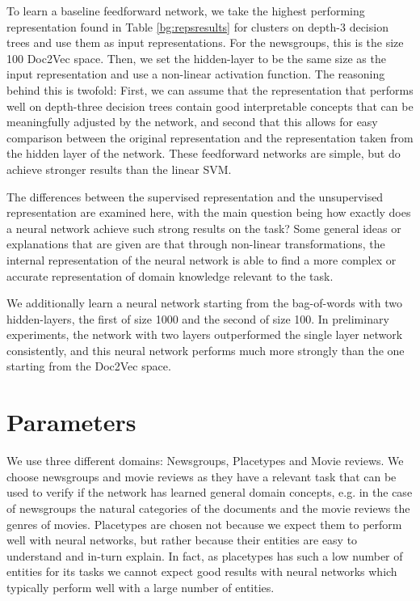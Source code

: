 To learn a baseline feedforward network, we take the highest performing representation found in Table \ref{bg:repsresults} for clusters on depth-3 decision trees and use them as input representations.   For the newsgroups, this is the size 100 Doc2Vec space. Then, we set the hidden-layer to be the same size as the input representation and use a non-linear activation function.  The reasoning behind this is twofold: First, we can assume that the representation that performs well on depth-three decision trees contain good interpretable concepts that can be meaningfully adjusted by the network, and second that this allows for easy comparison between the original representation and the representation taken from the hidden layer of the network. These feedforward networks are simple, but do achieve stronger results than the linear SVM.  

The  differences between the supervised representation and the unsupervised representation are examined here, with the main question being how exactly does a neural network achieve such strong results on the task? Some general ideas or explanations that are given are that through non-linear transformations, the internal representation of the neural network is able to find a more complex or accurate representation of domain knowledge relevant to the task.


We additionally learn a neural network starting from the bag-of-words  with two hidden-layers, the first of size 1000 and the second of size 100. In preliminary experiments, the network with two layers outperformed the single layer network consistently, and this neural network performs much more strongly than the one starting from the Doc2Vec space. 




\section{Parameters}

We use three different domains: Newsgroups, Placetypes and Movie reviews. We choose newsgroups and movie reviews as they have a relevant task that can be used to verify if the network has learned general domain concepts, e.g. in the case of newsgroups the natural categories of the documents and the movie reviews the genres of movies. Placetypes are chosen not because we expect them to perform well with neural networks, but rather because their entities are easy to understand and in-turn explain. In fact, as placetypes has such a low number of entities for its tasks we cannot expect good results with neural networks which typically perform well with a large number of entities.

